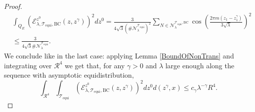 \documentclass{amsart}
\theoremstyle{definition}
\theoremstyle{remark}
\renewcommand\leq\leqslant
\numberwithin{equation}{section}
\theoremstyle{definition}
\theoremstyle{remark}
\begin{document}
\begin{proof}
	\begin{equation}
		\begin{aligned}
			&\int_{Q_E}\left(\mathcal{E}_{\lambda,\mathcal{T}_\mathrm{equi},\mathrm{BC}}^{z^0}(z,z^\gamma)\right)^2dz^0=\frac{3}{4\sqrt{3}\left(\#\mathcal{N}_\lambda^{\mathcal{T}_\mathrm{equi}}\right)^2}\sum_{N\in\mathcal{N}_\lambda^{\mathcal{T}_\mathrm{equi},\mathrm{BC}}}\cos\left(\frac{2\pi m\left(z_1-z_1^\gamma\right)}{3\sqrt{\lambda}}\right)^2\\&\leq\frac{3}{4\sqrt{3}\#\mathcal{N}_\lambda^{\mathcal{T}_\mathrm{equi}}}. \end{aligned}\end{equation}
	We conclude like in the last case: applying Lemma \ref{BoundOfNonTrans} and integrating over $\mathcal{R}^4$ we get that, for any $\gamma>0$ and $\lambda$ large enough along the sequence with asymptotic equidistribution, 
	\begin{equation}
		\int_{\mathcal{R}^{4}}\int_{	\mathcal{T}_\mathrm{equi}}\left(\mathcal{E}_{\lambda,\mathcal{T}_\mathrm{equi},\mathrm{BC}}^{z^0}(z,z^\gamma)\right)^2dz^0d(z^\gamma,x)\leq c_\gamma\lambda^{-\gamma} R^4.
	\end{equation}
\end{proof}
\end{document}
